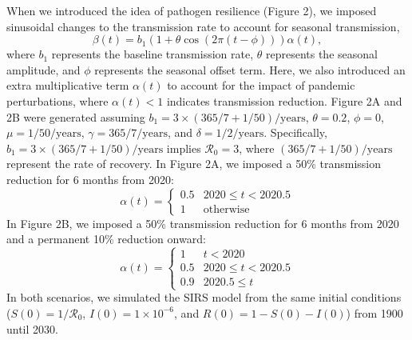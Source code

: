 \documentclass[12pt]{article}
\begin{document}
When we introduced the idea of pathogen resilience (Figure 2), we imposed sinusoidal changes to the transmission rate to account for seasonal transmission,
\begin{equation}
\beta(t) = b_1 (1 + \theta \cos(2 \pi (t-\phi))) \alpha(t),
\end{equation}
where $b_1$ represents the baseline transmission rate, $\theta$ represents the seasonal amplitude, and $\phi$ represents the seasonal offset term.
Here, we also introduced an extra multiplicative term $\alpha(t)$ to account for the impact of pandemic perturbations, where $\alpha(t) < 1$ indicates transmission reduction.
Figure 2A and 2B were generated assuming $b_1 = 3 \times (365/7+1/50)/\mathrm{years}$, $\theta=0.2$, $\phi=0$, $\mu=1/50/\mathrm{years}$, $\gamma=365/7/\mathrm{years}$, and $\delta=1/2/\mathrm{years}$.
Specifically, $b_1 = 3 \times (365/7+1/50)/\mathrm{years}$ implies $\mathcal R_0 = 3$, where $(365/7+1/50)/\mathrm{years}$ represent the rate of recovery.
In Figure 2A, we imposed a 50\% transmission reduction for 6 months from 2020:
\begin{equation}
\alpha(t) = \begin{cases}
0.5 & 2020 \leq t< 2020.5\\
1 & \textrm{otherwise}
\end{cases}
\end{equation}
In Figure 2B, we imposed a 50\% transmission reduction for 6 months from 2020 and a permanent 10\% reduction onward:
\begin{equation}
\alpha(t) = \begin{cases}
1 & t < 2020\\
0.5 & 2020 \leq t < 2020.5\\
0.9 & 2020.5 \leq t
\end{cases}
\end{equation}
In both scenarios, we simulated the SIRS model from the same initial conditions ($S(0) = 1/\mathcal R_0$, $I(0) = 1\times 10^{-6}$, and $R(0) = 1 - S(0) - I(0)$) from 1900 until 2030.
\end{document}
